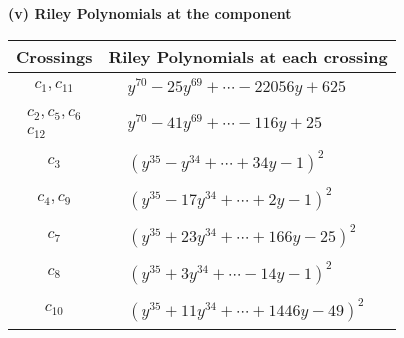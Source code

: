 \documentclass[1p]{elsarticle_modified}
\theoremstyle{definition}
\begin{document}
\newpage\renewcommand{\arraystretch}{1}
\flushleft \textbf{(v) Riley Polynomials at the component}\newline \\
\begin{tabular}{m{50pt}|m{274pt}}
Crossings & \hspace{64pt}Riley Polynomials at each crossing \\
\hline $$\begin{aligned}c_{1},c_{11}\end{aligned}$$&$\begin{aligned}
&y^{70}-25 y^{69}+\cdots-22056 y+625
\end{aligned}$\\
\hline $$\begin{aligned}c_{2},c_{5},c_{6}\\c_{12}\end{aligned}$$&$\begin{aligned}
&y^{70}-41 y^{69}+\cdots-116 y+25
\end{aligned}$\\
\hline $$\begin{aligned}c_{3}\end{aligned}$$&$\begin{aligned}
&(y^{35}- y^{34}+\cdots+34 y-1)^{2}
\end{aligned}$\\
\hline $$\begin{aligned}c_{4},c_{9}\end{aligned}$$&$\begin{aligned}
&(y^{35}-17 y^{34}+\cdots+2 y-1)^{2}
\end{aligned}$\\
\hline $$\begin{aligned}c_{7}\end{aligned}$$&$\begin{aligned}
&(y^{35}+23 y^{34}+\cdots+166 y-25)^{2}
\end{aligned}$\\
\hline $$\begin{aligned}c_{8}\end{aligned}$$&$\begin{aligned}
&(y^{35}+3 y^{34}+\cdots-14 y-1)^{2}
\end{aligned}$\\
\hline $$\begin{aligned}c_{10}\end{aligned}$$&$\begin{aligned}
&(y^{35}+11 y^{34}+\cdots+1446 y-49)^{2}
\end{aligned}$\\
\hline
\end{tabular}\\~\\
\end{document}
